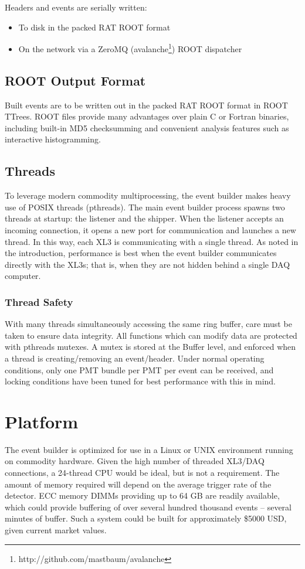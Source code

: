 \documentclass[11pt,twocolumn]{article}
\begin{document}
Headers and events are serially written:
\begin{itemize}
\item To disk in the packed RAT ROOT format
\item On the network via a ZeroMQ (avalanche\footnote{http://github.com/mastbaum/avalanche}) ROOT dispatcher
\end{itemize}

\subsection{ROOT Output Format}
Built events are to be written out in the packed RAT ROOT format in ROOT TTrees. ROOT files provide many advantages over plain C or Fortran binaries, including built-in MD5 checksumming and convenient analysis features such as interactive histogramming.

\subsection{Threads}
To leverage modern commodity multiprocessing, the event builder makes heavy use of POSIX threads (pthreads). The main event builder process spawns two threads at startup: the listener and the shipper. When the listener accepts an incoming connection, it opens a new port for communication and launches a new thread. In this way, each XL3 is communicating with a single thread. As noted in the introduction, performance is best when the event builder communicates directly with the XL3s; that is, when they are not hidden behind a single DAQ computer.

\subsubsection{Thread Safety}
With many threads simultaneously accessing the same ring buffer, care must be taken to ensure data integrity. All functions which can modify data are protected with pthreads mutexes. A mutex is stored at the Buffer level, and enforced when a thread is creating/removing an event/header. Under normal operating conditions, only one PMT bundle per PMT per event can be received, and locking conditions have been tuned for best performance with this in mind.

\section{Platform}
The event builder is optimized for use in a Linux or UNIX environment running on commodity hardware. Given the high number of threaded XL3/DAQ connections, a 24-thread CPU would be ideal, but is not a requirement. The amount of memory required will depend on the average trigger rate of the detector. ECC memory DIMMs providing up to 64 GB are readily available, which could provide buffering of over several hundred thousand events -- several minutes of buffer. Such a system could be built for approximately \$5000 USD, given current market values.
\end{document}
